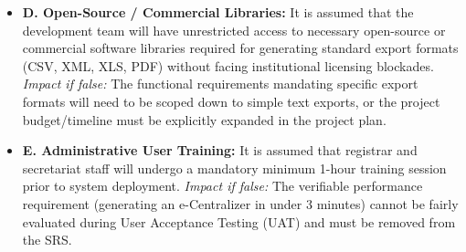 \documentclass[11pt, a4paper]{article}
\begin{document}
\begin{itemize}
    \item \textbf{D. Open-Source / Commercial Libraries:} It is assumed that the development team will have unrestricted access to necessary open-source or commercial software libraries required for generating standard export formats (CSV, XML, XLS, PDF) without facing institutional licensing blockades.
    \textit{Impact if false:} The functional requirements mandating specific export formats will need to be scoped down to simple text exports, or the project budget/timeline must be explicitly expanded in the project plan.
    \item \textbf{E. Administrative User Training:} It is assumed that registrar and secretariat staff will undergo a mandatory minimum 1-hour training session prior to system deployment.
    \textit{Impact if false:} The verifiable performance requirement (generating an e-Centralizer in under 3 minutes) cannot be fairly evaluated during User Acceptance Testing (UAT) and must be removed from the SRS.
\end{itemize}
\end{document}
